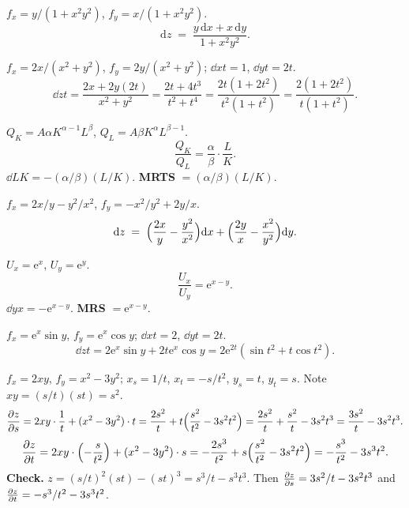 \begin{solutions}
  \item $f_{x}=y/(1+x^{2}y^{2})$, $f_{y}=x/(1+x^{2}y^{2})$.
        \[
          \mathrm{d}z \;=\; \frac{y\,\mathrm{d}x+x\,\mathrm{d}y}{1+x^{2}y^{2}} .
        \]

  \item $f_{x}=2x/(x^{2}+y^{2})$, $f_{y}=2y/(x^{2}+y^{2})$;
        $\dd{x}{t}=1$, $\dd{y}{t}=2t$.
        \[
          \dd{z}{t}=\frac{2x+2y(2t)}{x^{2}+y^{2}}
            =\frac{2t+4t^{3}}{t^{2}+t^{4}}
            =\frac{2t(1+2t^{2})}{t^{2}(1+t^{2})}
            =\frac{2(1+2t^{2})}{t(1+t^{2})} .
        \]

  \item $Q_{K}=A\alpha K^{\alpha-1}L^{\beta}$,
        $Q_{L}=A\beta K^{\alpha}L^{\beta-1}$.
        \[
          \frac{Q_{K}}{Q_{L}}=\frac{\alpha}{\beta}\cdot\frac{L}{K} .
        \]
        $\dd{L}{K}=-(\alpha/\beta)(L/K)$.
        \textbf{MRTS} $=(\alpha/\beta)(L/K)$.

  \item $f_{x}=2x/y-y^{2}/x^{2}$, $f_{y}=-x^{2}/y^{2}+2y/x$.
        \[
          \mathrm{d}z \;=\; \Bigl(\frac{2x}{y}-\frac{y^{2}}{x^{2}}\Bigr)\mathrm{d}x
            +\Bigl(\frac{2y}{x}-\frac{x^{2}}{y^{2}}\Bigr)\mathrm{d}y .
        \]

  \item $U_{x}=\mathrm{e}^{x}$, $U_{y}=\mathrm{e}^{y}$.
        \[
          \frac{U_{x}}{U_{y}}=\mathrm{e}^{x-y} .
        \]
        $\dd{y}{x}=-\mathrm{e}^{x-y}$. \textbf{MRS} $=\mathrm{e}^{x-y}$.

  \item $f_{x}=\mathrm{e}^{x}\sin y$, $f_{y}=\mathrm{e}^{x}\cos y$;
        $\dd{x}{t}=2$, $\dd{y}{t}=2t$.
        \[
          \dd{z}{t}=2\mathrm{e}^{x}\sin y+2t\mathrm{e}^{x}\cos y
            =2\mathrm{e}^{2t}(\sin t^{2}+t\cos t^{2}) .
        \]

  \item $f_{x}=2xy$, $f_{y}=x^{2}-3y^{2}$; $x_{s}=1/t$, $x_{t}=-s/t^{2}$,
        $y_{s}=t$, $y_{t}=s$. Note $xy=(s/t)(st)=s^{2}$.
        \[
          \frac{\partial z}{\partial s}=2xy\cdot\frac{1}{t}+(x^{2}-3y^{2})\cdot t
            =\frac{2s^{2}}{t}+t\Bigl(\frac{s^{2}}{t^{2}}-3s^{2}t^{2}\Bigr)
            =\frac{2s^{2}}{t}+\frac{s^{2}}{t}-3s^{2}t^{3}
            =\frac{3s^{2}}{t}-3s^{2}t^{3} .
        \]
        \[
          \frac{\partial z}{\partial t}=2xy\cdot\Bigl(-\frac{s}{t^{2}}\Bigr)+(x^{2}-3y^{2})\cdot s
            =-\frac{2s^{3}}{t^{2}}+s\Bigl(\frac{s^{2}}{t^{2}}-3s^{2}t^{2}\Bigr)
            =-\frac{s^{3}}{t^{2}}-3s^{3}t^{2} .
        \]
        \textbf{Check.} $z=(s/t)^{2}(st)-(st)^{3}=s^{3}/t-s^{3}t^{3}$. Then
        $\frac{\partial z}{\partial s}=3s^{2}/t-3s^{2}t^{3}$ and
        $\frac{\partial z}{\partial t}=-s^{3}/t^{2}-3s^{3}t^{2}$. \checkmark


\end{solutions}
